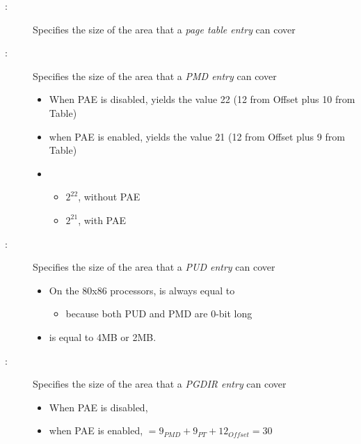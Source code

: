 \begin{description}
\item[:] Specifies the size of the area that a \emph{page table entry} can
  cover
\item[:] Specifies the size of the area that a \emph{PMD entry} can cover
  \begin{itemize}
  \item When PAE is disabled,  yields the value 22 (12 from Offset plus 10 from
    Table)
  \item when PAE is enabled,  yields the value 21 (12 from Offset plus 9 from
    Table)
  \item {}
    \begin{itemize}
    \item $2^{22}$, without PAE
    \item $2^{21}$, with PAE
    \end{itemize}
  \end{itemize}
\item[:] Specifies the size of the area that a \emph{PUD entry} can cover
  \begin{itemize}
  \item On the 80x86 processors,  is always equal to 
    \begin{itemize}
    \item because both PUD and PMD are 0-bit long
    \end{itemize}
  \item {} is equal to 4MB or 2MB.
  \end{itemize}
\item[:] Specifies the size of the area that a \emph{PGDIR entry} can cover
  \begin{itemize}
  \item When PAE is disabled, 
  \item when PAE is enabled,  $= 9_{PMD} + 9_{PT} + 12_{Offset} = 30$
  \end{itemize}
\end{description}

